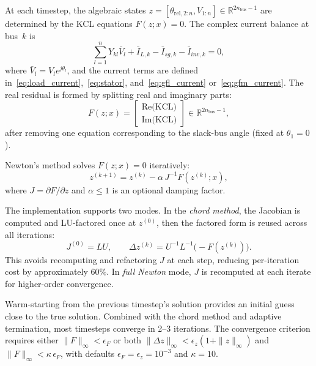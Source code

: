 \documentclass[11pt]{article}
\newcommand{\R}{\mathbb{R}}
\newcommand{\re}{\mathrm{Re}}
\newcommand{\im}{\mathrm{Im}}
\begin{document}
At each timestep, the algebraic states
$z = [\theta_{\mathrm{rel},2:n}, V_{1:n}] \in \R^{2n_{\mathrm{bus}}-1}$
are determined by the KCL equations $F(z; x) = 0$.  The complex
current balance at bus~$k$ is
\begin{equation}
  \sum_{l=1}^{n} Y_{kl} \bar{V}_l + \bar{I}_{L,k}
    - \bar{I}_{sg,k} - \bar{I}_{inv,k} = 0,
  \label{eq:kcl_complex}
\end{equation}
where $\bar{V}_l = V_l e^{j\theta_l}$, and the current terms are
defined in~\eqref{eq:load_current},~\eqref{eq:stator},
and~\eqref{eq:gfl_current} or~\eqref{eq:gfm_current}.
The real residual is formed by splitting real and imaginary parts:
\begin{equation}
  F(z; x) = \begin{bmatrix}
    \re\bigl(\text{KCL}\bigr) \\
    \im\bigl(\text{KCL}\bigr)
  \end{bmatrix} \in \R^{2n_{\mathrm{bus}}-1},
  \label{eq:kcl_real}
\end{equation}
after removing one equation corresponding to the slack-bus angle
(fixed at $\theta_1 = 0$).

Newton's method solves $F(z;x) = 0$ iteratively:
\begin{equation}
  z^{(k+1)} = z^{(k)} - \alpha\, J^{-1} F(z^{(k)}; x),
  \label{eq:newton}
\end{equation}
where $J = \partial F / \partial z$ and $\alpha \leq 1$ is an
optional damping factor.

The implementation supports two modes.  In the \textit{chord method},
the Jacobian is computed and LU-factored once at $z^{(0)}$, then
the factored form is reused across all iterations:
\begin{equation}
  J^{(0)} = LU, \qquad
  \Delta z^{(k)} = U^{-1}L^{-1}\bigl(-F(z^{(k)})\bigr).
  \label{eq:chord}
\end{equation}
This avoids recomputing and refactoring $J$ at each step, reducing
per-iteration cost by approximately $60\%$.  In \textit{full Newton}
mode, $J$ is recomputed at each iterate for higher-order convergence.

Warm-starting from the previous timestep's solution provides an
initial guess close to the true solution.  Combined with the chord
method and adaptive termination, most timesteps converge in 2--3
iterations.  The convergence criterion requires either
$\|F\|_\infty < \epsilon_F$ or both
$\|\Delta z\|_\infty < \epsilon_z (1 + \|z\|_\infty)$ and
$\|F\|_\infty < \kappa\, \epsilon_F$, with defaults
$\epsilon_F = \epsilon_z = 10^{-3}$ and $\kappa = 10$.
\end{document}
